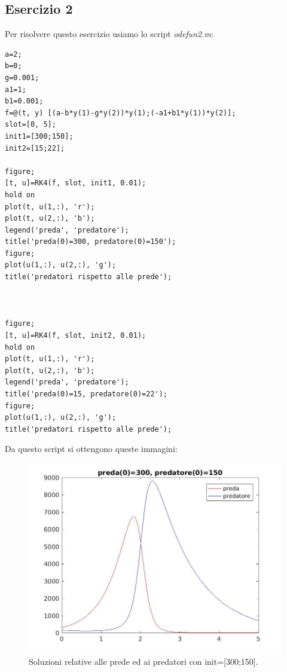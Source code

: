 \documentclass[11pt,a4paper,twoside,openright,titlepage,
headinclude,footinclude,BCOR5mm,
numbers=noenddot,cleardoublepage=empty,
tablecaptionabove]{scrbook}
\begin{document}
\subsection{Esercizio 2}
Per risolvere questo esercizio usiamo lo script \emph{odefun2.m}:
\begin{lstlisting}[frame=trBL]
a=2;
b=0;
g=0.001;
a1=1;
b1=0.001;
f=@(t, y) [(a-b*y(1)-g*y(2))*y(1);(-a1+b1*y(1))*y(2)];
slot=[0, 5];
init1=[300;150];
init2=[15;22];

figure;
[t, u]=RK4(f, slot, init1, 0.01);
hold on
plot(t, u(1,:), 'r');
plot(t, u(2,:), 'b');
legend('preda', 'predatore');
title('preda(0)=300, predatore(0)=150');
figure;
plot(u(1,:), u(2,:), 'g');
title('predatori rispetto alle prede');



figure;
[t, u]=RK4(f, slot, init2, 0.01);
hold on
plot(t, u(1,:), 'r');
plot(t, u(2,:), 'b');
legend('preda', 'predatore');
title('preda(0)=15, predatore(0)=22');
figure;
plot(u(1,:), u(2,:), 'g');
title('predatori rispetto alle prede');
\end{lstlisting}
Da questo script si ottengono queste immagini:
\begin{center}
\begin{figure}[h!]
\includegraphics[width=\textwidth]{figs/preda.jpg}
\caption{Soluzioni relative alle prede ed ai predatori con init=[300;150].}
\end{figure}
\end{center}
\end{document}
